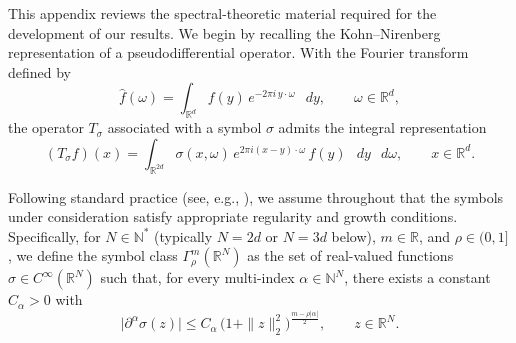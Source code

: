 \documentclass[a4paper,12pt]{article}
\newcommand{\N}{\mathbb{N}}
\newcommand{\R}{\mathbb{R}}
\newcommand{\diff}{\mathop{}\!d}
\newcommand{\psidosymbclass}{\Gamma^m_\rho}
\begin{document}
This appendix reviews the spectral-theoretic material required for the
development of our results.
We begin by recalling the Kohn--Nirenberg representation of a
pseudodifferential operator.
With the Fourier transform defined by
\begin{equation}\label{eq:definition-fourier-transform}
    \hat f(\omega)
    =
    \int_{\R^d} f(y)\, e^{-2\pi i\, y\cdot \omega}\,\diff y,
    \qquad \omega\in\R^d,
\end{equation}
the operator $T_\sigma$ associated with a symbol $\sigma$ admits the integral
representation
\begin{equation}\label{eq:kohn-nirenberg-def2}
    (T_\sigma f)(x)
    =
    \int_{\R^{2d}} \sigma(x,\omega)\,
    e^{2\pi i (x-y)\cdot\omega}\,
    f(y)\,\diff y\,\diff\omega,
    \qquad x\in\R^d.
\end{equation}

Following standard practice (see, e.g.,
\cite[Definition~23.1]{shubin_pseudodifferential_2001}),
we assume throughout that the symbols under consideration satisfy appropriate
regularity and growth conditions.
Specifically, for $N\in\N^*$ (typically $N=2d$ or $N=3d$ below), $m\in\R$, and
$\rho\in(0,1]$, we define the symbol class
$\psidosymbclass(\R^N)$ as the set of real-valued functions
$\sigma\in C^\infty(\R^N)$ such that, for every multi-index
$\alpha\in\N^N$, there exists a constant $C_\alpha>0$ with
\begin{equation}\label{eq:decay-cond-symbol-classs}
    \bigl|\partial^\alpha \sigma(z)\bigr|
    \le
    C_\alpha\,\bigl(1+\|z\|_2^2\bigr)^{\frac{m-\rho|\alpha|}{2}},
    \qquad z\in\R^N.
\end{equation}

\end{document}
